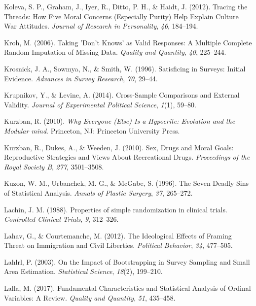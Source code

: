 \documentclass[12pt,econ]{sources/authesis}
\begin{document}
\leavevmode\hypertarget{ref-koleva_2012_tracing}{}%
Koleva, S. P., Graham, J., Iyer, R., Ditto, P. H., \& Haidt, J. (2012). Tracing the Threads: How Five Moral Concerns (Especially Purity) Help Explain Culture War Attitudes. \emph{Journal of Research in Personality}, \emph{46}, 184--194.

\leavevmode\hypertarget{ref-kroh_2006_taking}{}%
Kroh, M. (2006). Taking 'Don't Knows' as Valid Responses: A Multiple Complete Random Imputation of Missing Data. \emph{Quality and Quantity}, \emph{40}, 225--244.

\leavevmode\hypertarget{ref-krosnick_1996_satisficing}{}%
Krosnick, J. A., Sowmya, N., \& Smith, W. (1996). Satisficing in Surveys: Initial Evidence. \emph{Advances in Survey Research}, \emph{70}, 29--44.

\leavevmode\hypertarget{ref-krupnikov_2014_cross-sample}{}%
Krupnikov, Y., \& Levine, A. (2014). Cross-Sample Comparisons and External Validity. \emph{Journal of Experimental Political Science}, \emph{1}(1), 59--80.

\leavevmode\hypertarget{ref-kurzban_2010_everyone}{}%
Kurzban, R. (2010). \emph{Why Everyone (Else) Is a Hypocrite: Evolution and the Modular mind}. Princeton, NJ: Princeton University Press.

\leavevmode\hypertarget{ref-kurzban_2010_sex}{}%
Kurzban, R., Dukes, A., \& Weeden, J. (2010). Sex, Drugs and Moral Goals: Reproductive Strategies and Views About Recreational Drugs. \emph{Proceedings of the Royal Society B}, \emph{277}, 3501--3508.

\leavevmode\hypertarget{ref-kuzon_1996_seven}{}%
Kuzon, W. M., Urbanchek, M. G., \& McGabe, S. (1996). The Seven Deadly Sins of Statistical Analysis. \emph{Annals of Plastic Surgery}, \emph{37}, 265--272.

\leavevmode\hypertarget{ref-lachin_1988_properties}{}%
Lachin, J. M. (1988). Properties of simple randomization in clinical trials. \emph{Controlled Clinical Trials}, \emph{9}, 312--326.

\leavevmode\hypertarget{ref-lahav_ideological_2012}{}%
Lahav, G., \& Courtemanche, M. (2012). The Ideological Effects of Framing Threat on Immigration and Civil Liberties. \emph{Political Behavior}, \emph{34}, 477--505.

\leavevmode\hypertarget{ref-lahlrl_2003_impact}{}%
Lahlrl, P. (2003). On the Impact of Bootstrapping in Survey Sampling and Small Area Estimation. \emph{Statistical Science}, \emph{18}(2), 199--210.

\leavevmode\hypertarget{ref-lalla_2017_fundamental}{}%
Lalla, M. (2017). Fundamental Characteristics and Statistical Analysis of Ordinal Variables: A Review. \emph{Quality and Quantity}, \emph{51}, 435--458.
\end{document}
